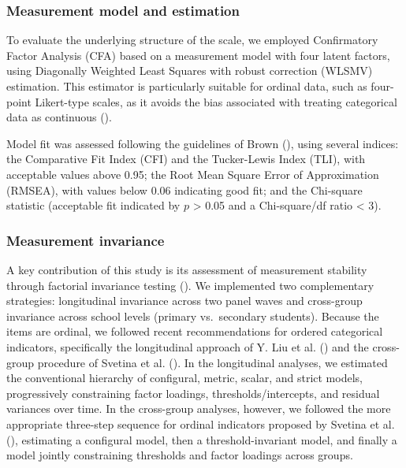 \documentclass[
  13pt,
]{article}
\begin{document}
\subsubsection{Measurement model and
estimation}\label{measurement-model-and-estimation}

To evaluate the underlying structure of the scale, we employed
Confirmatory Factor Analysis (CFA) based on a measurement model with
four latent factors, using Diagonally Weighted Least Squares with robust
correction (WLSMV) estimation. This estimator is particularly suitable
for ordinal data, such as four-point Likert-type scales, as it avoids
the bias associated with treating categorical data as continuous
().

Model fit was assessed following the guidelines of Brown
(), using several indices:
the Comparative Fit Index (CFI) and the Tucker-Lewis Index (TLI), with
acceptable values above 0.95; the Root Mean Square Error of
Approximation (RMSEA), with values below 0.06 indicating good fit; and
the Chi-square statistic (acceptable fit indicated by \(p\)
\textgreater{} 0.05 and a Chi-square/df ratio \textless{} 3).

\subsubsection{Measurement invariance}\label{measurement-invariance}

A key contribution of this study is its assessment of measurement
stability through factorial invariance testing
().
We implemented two complementary strategies: longitudinal invariance
across two panel waves and cross-group invariance across school levels
(primary vs.~secondary students). Because the items are ordinal, we
followed recent recommendations for ordered categorical indicators,
specifically the longitudinal approach of Y. Liu et al.
() and the cross-group procedure of
Svetina et al. (). In the
longitudinal analyses, we estimated the conventional hierarchy of
configural, metric, scalar, and strict models, progressively
constraining factor loadings, thresholds/intercepts, and residual
variances over time. In the cross-group analyses, however, we followed
the more appropriate three-step sequence for ordinal indicators proposed
by Svetina et al. (),
estimating a configural model, then a threshold-invariant model, and
finally a model jointly constraining thresholds and factor loadings
across groups.
\end{document}
